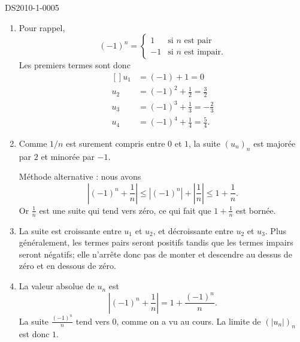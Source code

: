 
\begin{corrige}{DS2010-1-0005}

	\begin{enumerate}
		\item
			Pour rappel, 
			\begin{equation}
				(-1)^n=\begin{cases}
                    1	&	\text{si }n \text{ est pair}\\
                    -1	&	 \text{si }n \text{ est impair}.
				\end{cases}
			\end{equation}
			Les premiers termes sont donc
			\begin{equation}
				\begin{aligned}[]
					u_1&=(-1)+1=0\\
					u_2&=(-1)^2+\frac{ 1 }{2}=\frac{ 3 }{ 2 }\\
					u_3&=(-1)^3+\frac{1}{ 3 }=-\frac{ 2 }{ 3 }\\
					u_4&=(-1)^4+\frac{1}{ 4 }=\frac{ 5 }{ 4 }.
				\end{aligned}
			\end{equation}
		\item
                  Comme $1/n$ est surement compris entre $0$ et $1$, la suite $(u_n)_n$ est majorée par $2$ et minorée par $-1$.

		  Méthode alternative : nous avons
			\begin{equation}
				\left| (-1)^n+\frac{1}{ n } \right| \leq | (-1)^n |+\left| \frac{1}{ n } \right| \leq 1+\frac{1}{ n }.
			\end{equation}
			Or $\frac{1}{ n }$ est une suite qui tend vers zéro, ce qui fait que $1+\frac{1}{ n }$ est bornée.
		\item
			La suite est croissante entre $u_1$ et $u_2$, et décroissante entre $u_2$ et $u_3$. Plus généralement, les termes pairs seront positifs tandis que les termes impairs seront négatifs; elle n'arrête donc pas de monter et descendre au dessus de zéro et en dessous de zéro.
		\item
		   La valeur absolue de $u_n$ est
                  \begin{equation}
				\left| (-1)^n+\frac{1}{ n } \right| =1+ \frac{(-1)^n }{ n }.
			\end{equation}
                  La suite $\frac{(-1)^n }{ n }$ tend vers $0$, comme on a vu au cours. La limite de $(|u_n|)_n$ est donc $1$.


\end{enumerate}
\end{corrige}
